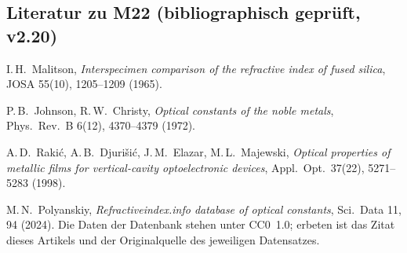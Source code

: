 \subsection*{Literatur zu M22 (bibliographisch geprüft, v2.20)}
\begin{enumerate}[label={[D\arabic*]},nosep,leftmargin=2.6em]
  \item I.\,H.~Malitson, \emph{Interspecimen comparison of the refractive index of fused silica}, JOSA 55(10), 1205--1209 (1965).
  \item P.\,B.~Johnson, R.\,W.~Christy, \emph{Optical constants of the noble metals}, Phys.\ Rev.\ B 6(12), 4370--4379 (1972).
  \item A.\,D.~Raki\'c, A.\,B.~Djuri\v{s}i\'c, J.\,M.~Elazar, M.\,L.~Majewski, \emph{Optical properties of metallic
        films for vertical-cavity optoelectronic devices}, Appl.\ Opt.\ 37(22), 5271--5283 (1998).
  \item M.\,N.~Polyanskiy, \emph{Refractiveindex.info database of optical constants}, Sci.\ Data 11, 94 (2024).
        Die Daten der Datenbank stehen unter CC0~1.0; erbeten ist das Zitat dieses Artikels und der Originalquelle
        des jeweiligen Datensatzes.
\end{enumerate}
